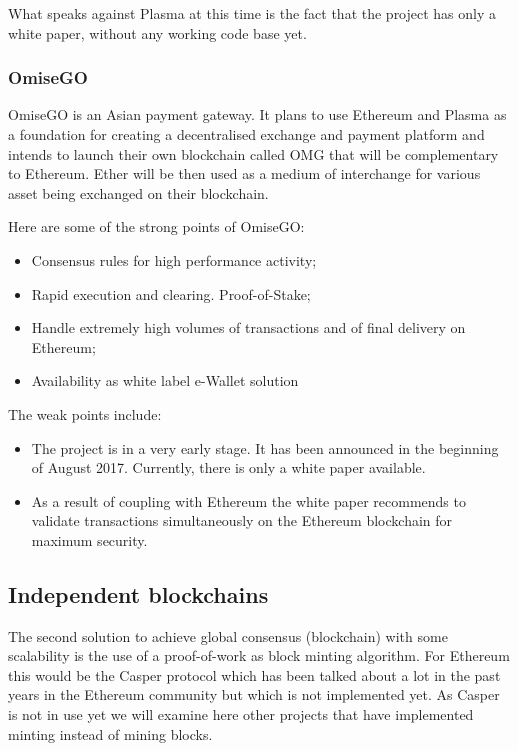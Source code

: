 What speaks against Plasma at this time is the fact that the project has only a white paper, without any working code base yet.

\subsubsection{OmiseGO}
OmiseGO is an Asian payment gateway. It plans to use Ethereum and Plasma as a foundation for creating a decentralised exchange and payment platform \cite{OMG} and intends to launch their own blockchain called OMG that will be complementary to Ethereum. Ether will be then used as a medium of interchange for various asset being exchanged on their blockchain.

Here are some of the strong points of OmiseGO:
\begin{itemize}
    \item Consensus rules for high performance activity;
    \item Rapid execution and clearing. Proof-of-Stake;
    \item Handle extremely high volumes of transactions and of final delivery on Ethereum;
    \item Availability as white label e-Wallet solution
\end{itemize}

The weak points include:

\begin{itemize}
    \item The project is in a very early stage. It has been announced in the beginning of August 2017. Currently, there is only a white paper available.
    \item As a result of coupling with Ethereum the white paper recommends to validate transactions simultaneously on the Ethereum blockchain for maximum security.
\end{itemize}

\subsection{Independent blockchains}
The second solution to achieve global consensus (blockchain) with some scalability is the use of a proof-of-work as block minting algorithm. For Ethereum this would be the Casper protocol which has been talked about a lot in the past years in the Ethereum community but which is not implemented yet. As Casper is not in use yet we will examine here other projects that have implemented minting instead of mining blocks.

